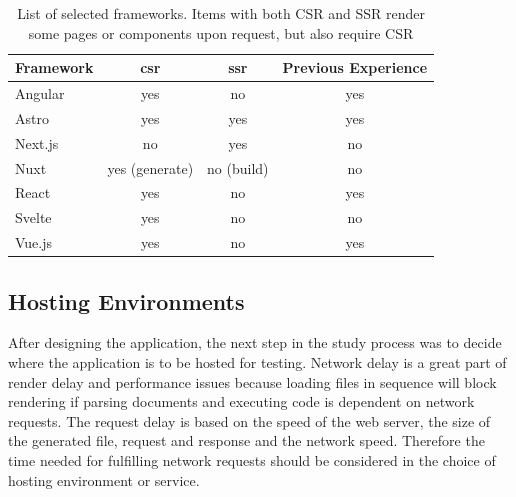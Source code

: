 \documentclass[a4paper, 10pt]{article}
\begin{document}
\begin{table}
  \begin{center}
    \begin{tabular}[h]{l c c c }
      \textbf{Framework} & \textbf{\acrshort{csr}} & \textbf{\acrshort{ssr}} & \textbf{Previous Experience} \\ \hline
      Angular & yes & no & yes \\ \hline
      Astro   & yes & yes & yes \\ \hline
      Next.js & no & yes & no \\ \hline
      Nuxt    & yes (generate) & no (build) & no \\ \hline
      React   & yes & no & yes \\ \hline
      Svelte  & yes & no & no \\ \hline
      Vue.js  & yes & no & yes \\ 
    \end{tabular}
  \end{center}
  \caption{List of selected frameworks. Items with both CSR and SSR render some pages or components upon request, but also require CSR}\label{tab:frameworks}
\end{table}


\subsection{Hosting Environments}\label{subsec:hostingenvironments}
% 
% 

After designing the application, the next step in the study process was to decide where the application is to be hosted for testing.
Network delay is a great part of render delay and performance issues %
because loading files in sequence will block rendering if parsing documents and executing code is dependent on network requests.
The request delay is based on the speed of the web server, the size of the generated file, request and response and the network speed.
Therefore the time needed for fulfilling network requests should be considered in the choice of hosting environment or service.
\end{document}

